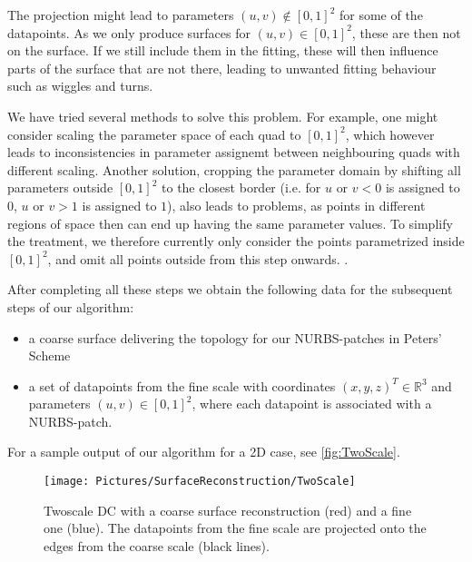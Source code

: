 The projection might lead to parameters $\left(u,v\right)\not\in\left[0,1\right]^2$ for some of the datapoints. As we only produce surfaces for $\left(u,v\right)\in\left[0,1\right]^2$, these are then not on the surface. If we still include them in the fitting, these will then influence parts of the surface that are not there, leading to unwanted fitting behaviour such as wiggles and turns. 

We have tried several methods to solve this problem. For example, one might consider scaling the parameter space of each quad to $\left[0,1\right]^2$, which however leads to inconsistencies in parameter assignemt between neighbouring quads with different scaling. Another solution, cropping the parameter domain by shifting all parameters outside $\left[0,1\right]^2$ to the closest border (i.e. for $u \text{ or } v < 0$ is assigned to $0$, $u \text{ or } v >1$ is assigned to $1$), also leads to problems, as points in different regions of space then can end up having the same parameter values. To simplify the treatment, we therefore currently only consider the points parametrized inside $\left[0,1\right]^2$, and omit all points outside from this step onwards. .

After completing all these steps we obtain the following data for the subsequent steps of our algorithm:
\begin{itemize}
\item a coarse surface delivering the topology for our \ac{NURBS}-patches in Peters' Scheme
\item a set of datapoints from the fine scale with coordinates $\left(x,y,z\right)^T\in\mathbb{R}^3$ and parameters $\left(u,v\right)\in\left[0,1\right]^2$, where each datapoint is associated with a \ac{NURBS}-patch. 
\end{itemize}
For a sample output of our algorithm for a 2D case, see \autoref{fig:TwoScale}.

\begin{figure}
\begin{center}
\texttt{[image: Pictures/SurfaceReconstruction/TwoScale]}
\caption{Twoscale \acl{DC} with a coarse surface reconstruction (red) and a fine one (blue). The datapoints from the fine scale are projected onto the edges from the coarse scale (black lines).}
\label{fig:TwoScale}
\end{center}
\end{figure}
\begin{comment}
\subsubsection{Parameter estimation}
\todo[inline]{explain different strategies, comparison of final results would be great (could also be part of third milestone?)}
\todo[inline]{show possible problems}
\end{comment}
